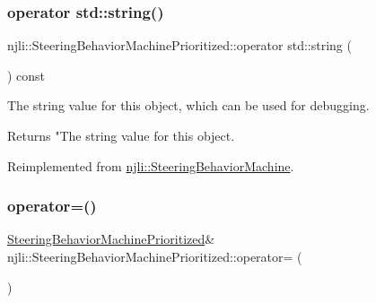 \subsubsection{\texorpdfstring{operator std\+::string()}{operator std::string()}}
{\footnotesize\ttfamily njli\+::\+Steering\+Behavior\+Machine\+Prioritized\+::operator std\+::string (\begin{DoxyParamCaption}{ }\end{DoxyParamCaption}) const\hspace{0.3cm}{\ttfamily [virtual]}}

The string value for this object, which can be used for debugging.

\begin{DoxyReturn}{Returns}
"The string value for this object. 
\end{DoxyReturn}


Reimplemented from \mbox{\hyperlink{classnjli_1_1_steering_behavior_machine_a08dc60d265fe55badc0137c1a4427343}{njli\+::\+Steering\+Behavior\+Machine}}.

\mbox{\label{classnjli_1_1_steering_behavior_machine_prioritized_ae26142263f740261904ec19c71ca2f19}} 
\subsubsection{\texorpdfstring{operator=()}{operator=()}}
{\footnotesize\ttfamily \mbox{\hyperlink{classnjli_1_1_steering_behavior_machine_prioritized}{Steering\+Behavior\+Machine\+Prioritized}}\& njli\+::\+Steering\+Behavior\+Machine\+Prioritized\+::operator= (\begin{DoxyParamCaption}\item[{const \mbox{\hyperlink{classnjli_1_1_steering_behavior_machine_prioritized}{Steering\+Behavior\+Machine\+Prioritized}} \&}]{ }\end{DoxyParamCaption})\hspace{0.3cm}{\ttfamily [protected]}}

\mbox{\label{classnjli_1_1_steering_behavior_machine_prioritized_a2f3fa591ca198f2d45b1d49d73173b65}} 
